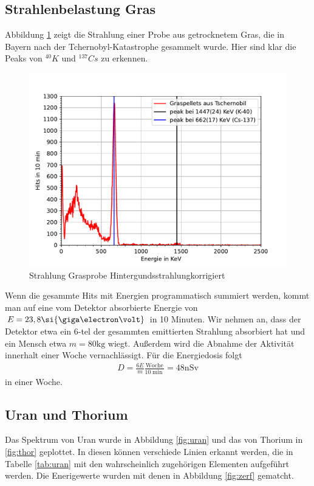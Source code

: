 \documentclass[11pt, a4paper]{article}
\begin{document}
    \subsection{Strahlenbelastung Gras}
    Abbildung \ref{fig:gras} zeigt die Strahlung einer Probe aus getrocknetem Gras, die in Bayern nach der Tchernobyl-Katastrophe gesammelt wurde. Hier sind klar die Peaks von $^{40}K$ und $^{137}Cs$ zu erkennen.
    \begin{figure}[!h]
        \centering
        \includegraphics[width=\textwidth]{Plots/Tschern.pdf}
        \caption{Strahlung Grasprobe Hintergundsstrahlungkorrigiert}
        \label{fig:gras}
    \end{figure}
    Wenn die gesammte Hits mit Energien programmatisch summiert werden, kommt man auf eine vom Detektor absorbierte Energie von $E = 23,8 \si{\giga\electron\volt}$ in 10 Minuten. Wir nehmen an, dass der Detektor etwa ein 6-tel der gesammten emittierten Strahlung absorbiert hat und ein Mensch etwa $m = 80 \si{\kilogram}$ wiegt. Außerdem wird die Abnahme der Aktivität innerhalt einer Woche vernachlässigt. Für die Energiedosis folgt
    \begin{align}
        D = \frac{6 E}{m} \frac{\text{Woche}}{10 \si{\min}} = 48 \si{\nano\sievert}
    \end{align}
    in einer Woche.



    \subsection{Uran und Thorium}
    Das Spektrum von Uran wurde in Abbildung \ref{fig:uran} und das von Thorium in \ref{fig:thor} geplottet. In diesen können verschiede Linien erkannt werden, die in Tabelle \ref{tab:uran} mit den wahrscheinlich zugehörigen Elementen aufgeführt werden. Die Enerigewerte wurden mit denen in Abbildung \ref{fig:zerf} gematcht.
\end{document}
